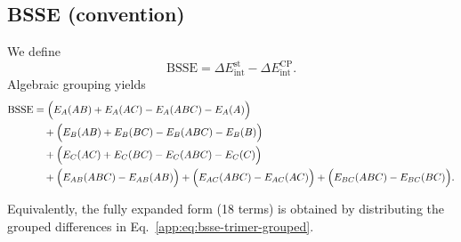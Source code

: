 \subsection*{BSSE (convention)}
We define
\[
\mathrm{BSSE} = \Delta E_{\mathrm{int}}^{\mathrm{st}} - \Delta E_{\mathrm{int}}^{\mathrm{CP}}.
\]
Algebraic grouping yields
\begin{align}
\label{app:eq:bsse-trimer-grouped}
\mathrm{BSSE}
&=\Bigl( E_{A}(AB)+E_{A}(AC) - E_{A}(ABC) - E_{A}(A) \Bigr) \notag\\
&\quad+ \Bigl( E_{B}(AB)+E_{B}(BC) - E_{B}(ABC) - E_{B}(B) \Bigr) \notag\\
&\quad+ \Bigl( E_{C}(AC)+E_{C}(BC) - E_{C}(ABC) - E_{C}(C) \Bigr) \notag\\
&\quad+ \Bigl( E_{AB}(ABC) - E_{AB}(AB) \Bigr)
      + \Bigl( E_{AC}(ABC) - E_{AC}(AC) \Bigr)
      + \Bigl( E_{BC}(ABC) - E_{BC}(BC) \Bigr).
\end{align}

\noindent
Equivalently, the fully expanded form (18 terms) is obtained by distributing the
grouped differences in Eq.~\eqref{app:eq:bsse-trimer-grouped}.
